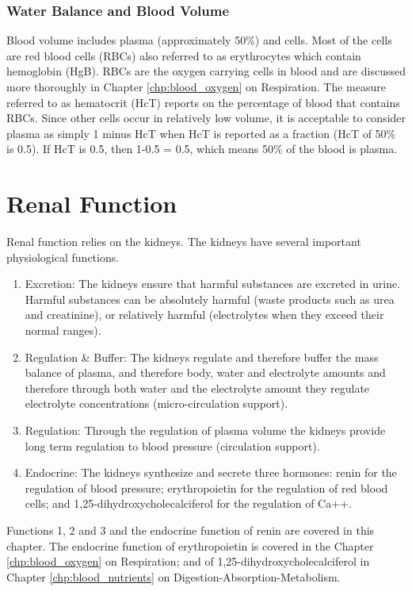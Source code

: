 \subsubsection{Water Balance and Blood Volume}

Blood volume includes plasma (approximately 50\%) and cells. Most of the cells are red blood cells (RBCs) also referred to as erythrocytes which contain hemoglobin (HgB). RBCs are the oxygen carrying cells in blood and are discussed more thoroughly in Chapter \ref{chp:blood_oxygen} on Respiration. The measure referred to as hematocrit (HcT) reports on the percentage of blood that contains RBCs. Since other cells occur in relatively low volume, it is acceptable to consider plasma as simply 1 minus HcT when HcT is reported as a fraction (HcT of 50\% is 0.5). If HcT is 0.5, then 1-0.5 = 0.5, which means 50\% of the blood is plasma.

\section{Renal Function}

Renal function relies on the kidneys. The kidneys have several important physiological functions. 

\begin{enumerate}
    \item Excretion: The kidneys ensure that harmful substances are excreted in urine. Harmful substances can be absolutely harmful (waste products such as urea and creatinine), or relatively harmful (electrolytes when they exceed their normal ranges).
    \item Regulation \& Buffer: The kidneys regulate and therefore buffer the mass balance of plasma, and therefore body, water and electrolyte amounts and therefore through both water and the electrolyte amount they regulate electrolyte concentrations (micro-circulation support).
    \item Regulation: Through the regulation of plasma volume the kidneys provide long term regulation to blood pressure (circulation support).
    \item Endocrine: The kidneys synthesize and secrete three hormones: renin for the regulation of blood pressure; erythropoietin for the regulation of red blood cells; and 1,25-dihydroxycholecalciferol for the regulation of Ca++.
\end{enumerate}

Functions 1, 2 and 3 and the endocrine function of renin are covered in this chapter. The endocrine function of erythropoietin is covered in the Chapter \ref{chp:blood_oxygen} on Respiration; and of 1,25-dihydroxycholecalciferol in Chapter \ref{chp:blood_nutrients} on Digestion-Absorption-Metabolism.

